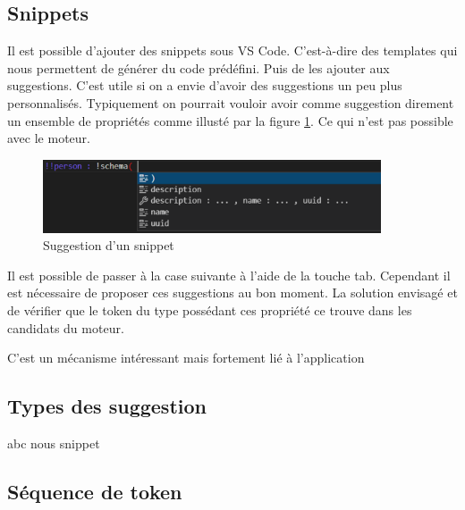 \documentclass[
    iict, %
    il, %
]{heig-tb}
\begin{document}

\subsection{Snippets}
Il est possible d'ajouter des snippets sous VS Code. C'est-à-dire des templates qui nous permettent de générer du code prédéfini. Puis de les ajouter aux suggestions.
C'est utile si on a envie d'avoir des suggestions un peu plus personnalisés.
Typiquement on pourrait vouloir avoir comme suggestion direment un ensemble de propriétés comme illusté par la figure \ref*{snippet-suggestion}.
Ce qui n'est pas possible avec le moteur.

\begin{figure}[!h]
    \begin{center}
        \includegraphics[width=10cm]{assets/figures/snippet-suggestion.png}
    \end{center}
    \caption[Suggestion d'un snippet]{\label{snippet-suggestion} Suggestion d'un snippet}
\end{figure}



Il est possible de passer à la case suivante à l'aide de la touche tab. %
Cependant il est nécessaire de proposer ces suggestions au bon moment. La solution envisagé et de vérifier que le token du type possédant ces propriété ce trouve dans les candidats du moteur.

C'est un mécanisme intéressant mais fortement lié à l'application

\subsection{Types des suggestion}
abc
nous
snippet

\subsection{Séquence de token}

\end{document}

